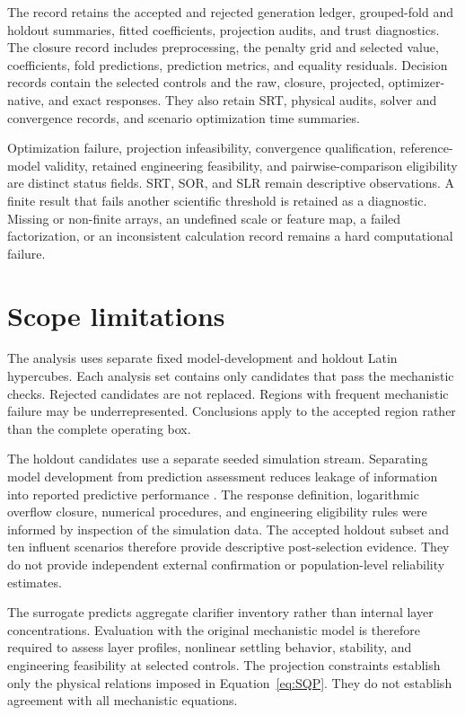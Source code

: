 \documentclass[a4paper,fleqn]{cas-sc}
\begin{document}
The record retains the accepted and rejected generation ledger, grouped-fold and holdout summaries, fitted coefficients, projection audits, and trust diagnostics. The closure record includes preprocessing, the penalty grid and selected value, coefficients, fold predictions, prediction metrics, and equality residuals. Decision records contain the selected controls and the raw, closure, projected, optimizer-native, and exact responses. They also retain SRT, physical audits, solver and convergence records, and scenario optimization time summaries.

Optimization failure, projection infeasibility, convergence qualification, reference-model validity, retained engineering feasibility, and pairwise-comparison eligibility are distinct status fields. SRT, SOR, and SLR remain descriptive observations. A finite result that fails another scientific threshold is retained as a diagnostic. Missing or non-finite arrays, an undefined scale or feature map, a failed factorization, or an inconsistent calculation record remains a hard computational failure.

\section{Scope limitations}
\label{sec:Shistory}

The analysis uses separate fixed model-development and holdout Latin hypercubes. Each analysis set contains only candidates that pass the mechanistic checks. Rejected candidates are not replaced. Regions with frequent mechanistic failure may be underrepresented. Conclusions apply to the accepted region rather than the complete operating box.

The holdout candidates use a separate seeded simulation stream. Separating model development from prediction assessment reduces leakage of information into reported predictive performance \citep{Kaufman2012}. The response definition, logarithmic overflow closure, numerical procedures, and engineering eligibility rules were informed by inspection of the simulation data. The accepted holdout subset and ten influent scenarios therefore provide descriptive post-selection evidence. They do not provide independent external confirmation or population-level reliability estimates.

The surrogate predicts aggregate clarifier inventory rather than internal layer concentrations. Evaluation with the original mechanistic model is therefore required to assess layer profiles, nonlinear settling behavior, stability, and engineering feasibility at selected controls. The projection constraints establish only the physical relations imposed in Equation~\eqref{eq:SQP}. They do not establish agreement with all mechanistic equations.
\end{document}
